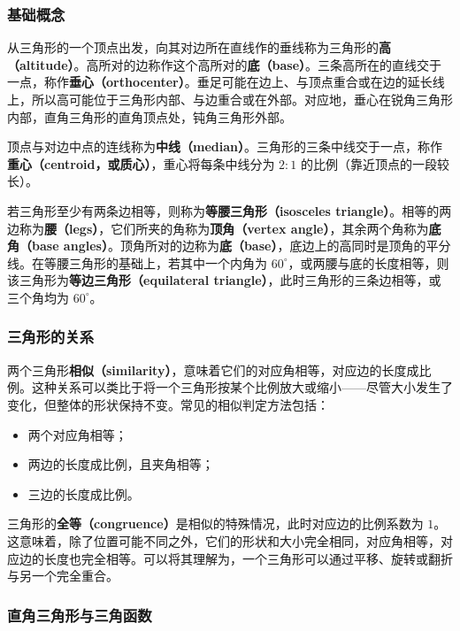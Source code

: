 \subsubsection{基础概念}

从三角形的一个顶点出发，向其对边所在直线作的垂线称为三角形的\textbf{高（altitude）}。高所对的边称作这个高所对的\textbf{底（base）}。三条高所在的直线交于一点，称作\textbf{垂心（orthocenter）}。垂足可能在边上、与顶点重合或在边的延长线上，所以高可能位于三角形内部、与边重合或在外部。对应地，垂心在锐角三角形内部，直角三角形的直角顶点处，钝角三角形外部。

顶点与对边中点的连线称为\textbf{中线（median）}。三角形的三条中线交于一点，称作\textbf{重心（centroid，或质心）}，重心将每条中线分为 $2:1$ 的比例（靠近顶点的一段较长）。

若三角形至少有两条边相等，则称为\textbf{等腰三角形（isosceles triangle）}。相等的两边称为\textbf{腰（legs）}，它们所夹的角称为\textbf{顶角（vertex angle）}，其余两个角称为\textbf{底角（base angles）}。顶角所对的边称为\textbf{底（base）}，底边上的高同时是顶角的平分线。在等腰三角形的基础上，若其中一个内角为 $60^\circ$，或两腰与底的长度相等，则该三角形为\textbf{等边三角形（equilateral triangle）}，此时三角形的三条边相等，或三个角均为 $60^\circ$。

\subsubsection{三角形的关系}

两个三角形\textbf{相似（similarity）}，意味着它们的对应角相等，对应边的长度成比例。这种关系可以类比于将一个三角形按某个比例放大或缩小——尽管大小发生了变化，但整体的形状保持不变。常见的相似判定方法包括：
\begin{itemize}
\item 两个对应角相等；
\item 两边的长度成比例，且夹角相等；
\item 三边的长度成比例。
\end{itemize}

三角形的\textbf{全等（congruence）}是相似的特殊情况，此时对应边的比例系数为 $1$。这意味着，除了位置可能不同之外，它们的形状和大小完全相同，对应角相等，对应边的长度也完全相等。可以将其理解为，一个三角形可以通过平移、旋转或翻折与另一个完全重合。

\subsubsection{直角三角形与三角函数}

